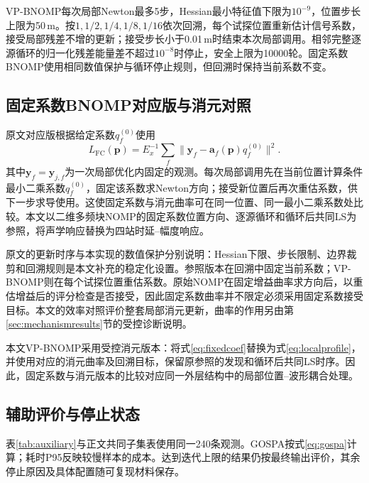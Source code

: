\documentclass[a4paper,fleqn]{cas-sc}
\numberwithin{equation}{section}
\numberwithin{figure}{section}
\numberwithin{table}{section}
\begin{document}
VP-BNOMP每次局部Newton最多5步，Hessian最小特征值下限为$10^{-9}$，位置步长上限为50\,m。按$1,1/2,1/4,1/8,1/16$依次回溯，每个试探位置重新估计信号系数，接受局部残差不增的更新；接受步长小于0.01\,m时结束本次局部调用。相邻完整逐源循环的归一化残差能量差不超过$10^{-8}$时停止，安全上限为10000轮。固定系数BNOMP使用相同数值保护与循环停止规则，但回溯时保持当前系数不变。

\subsection{固定系数BNOMP对应版与消元对照}
原文对应版根据给定系数$q_f^{(0)}$使用
\begin{equation}
 L_{\mathrm{FC}}(\bm p)=E_x^{-1}\sum_f
 \|\bm y_f-\bm a_f(\bm p)q_f^{(0)}\|^2 .\label{eq:fixedcoef}
\end{equation}
其中$\bm y_f=\bm y_{j,f}$为一次局部优化内固定的观测。每次局部调用先在当前位置计算条件最小二乘系数$q_f^{(0)}$，固定该系数求Newton方向；接受新位置后再次重估系数，供下一步求导使用。这使固定系数与消元曲率可在同一位置、同一最小二乘系数处比较。本文以二维多频块NOMP\cite{Yang2022}的固定系数位置方向、逐源循环和循环后共同LS为参照，将声学响应替换为四站时延--幅度响应。

原文的更新时序与本实现的数值保护分别说明：Hessian下限、步长限制、边界裁剪和回溯规则是本文补充的稳定化设置。参照版本在回溯中固定当前系数；VP-BNOMP则在每个试探位置重估系数。原始NOMP在固定增益曲率求方向后，以重估增益后的评分检查是否接受\cite{Mamandipoor2016}，因此固定系数曲率并不限定必须采用固定系数接受目标。本文的效率对照评价整套局部消元更新，曲率的作用另由第\ref{sec:mechanismresults}节的受控诊断说明。

本文VP-BNOMP采用受控消元版本：将式\eqref{eq:fixedcoef}替换为式\eqref{eq:localprofile}，并使用对应的消元曲率及回溯目标，保留原参照的发现和循环后共同LS时序。因此，固定系数与消元版本的比较对应同一外层结构中的局部位置--波形耦合处理。

\subsection{辅助评价与停止状态}
表\ref{tab:auxiliary}与正文共同子集表使用同一240条观测。GOSPA按式\eqref{eq:gospa}计算；耗时P95反映较慢样本的成本。达到迭代上限的结果仍按最终输出评价，其余停止原因及具体配置随可复现材料保存。
\end{document}
